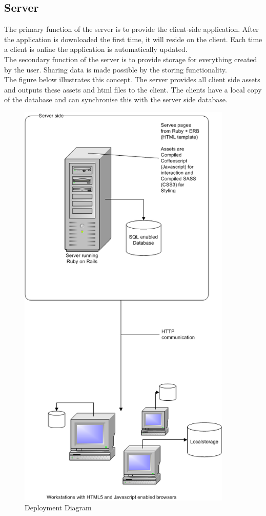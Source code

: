 \documentclass{report}
\begin{document}
			\subsection{Server}
				The primary function of the server is to provide the client-side application. After the application is downloaded the first time, it will reside on the client. Each time a client is online the application is automatically updated. \\
				The secondary function of the server is to provide storage for everything created by the user. Sharing data is made possible by the storing functionality. \\
				The figure below illustrates this concept. The server provides all client side assets and outputs these assets and html files to the client. The clients have a local copy of the database and can synchronise this with the server side database.
				\clearpage
				\begin{figure}[htb]
					\begin{center}
						\includegraphics[height=20cm,keepaspectratio=true]{EAD.png}
						\caption{Deployment Diagram}
						\label{fig: EAD}
					\end{center}
				\end{figure}
				\clearpage
									
\end{document}
